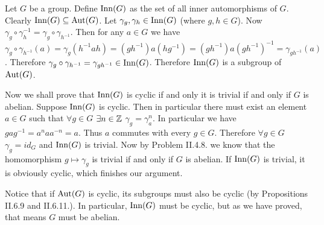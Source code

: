 \begin{problem}
\end{problem}

\begin{solution}
	Let $G$ be a group. Define $\mathrm{Inn}(G)$ as the set of all inner automorphisms of $G$. Clearly $\mathrm{Inn}(G) \subseteq \mathrm{Aut}(G)$. Let $\gamma_g, \gamma_h \in \mathrm{Inn}(G)$ (where $g, h \in G$). Now $\gamma_g \circ \gamma_h^{-1} = \gamma_g \circ \gamma_{h^{-1}}$. Then for any $a \in G$ we have $\gamma_g \circ \gamma_{h^{-1}} (a) = \gamma_g(h^{-1} a h) = (gh^{-1}) a (h g^{-1}) = (gh^{-1}) a (g h^{-1})^{-1} = \gamma_{gh^{-1}} (a)$. Therefore $\gamma_g \circ \gamma_{h^{-1}} = \gamma_{g h^{-1}} \in \mathrm{Inn}(G)$. Therefore $\mathrm{Inn}(G)$ is a subgroup of $\mathrm{Aut}(G)$.
	
	Now we shall prove that $\mathrm{Inn}(G)$ is cyclic if and only it is trivial if and only if $G$ is abelian. Suppose $\mathrm{Inn}(G)$ is cyclic. Then in particular there must exist an element $a \in G$ such that $\forall g \in G$ $\exists n \in \mathbb{Z}$ $\gamma_g = \gamma_a^n$. In particular we have $g a g^{-1} = a^n a a^{-n} = a$. Thus $a$ commutes with every $g \in G$. Therefore $\forall g \in G$ $\gamma_g = id_G$ and $\mathrm{Inn}(G)$ is trivial. Now by Problem II.4.8. we know that the homomorphism $g \mapsto \gamma_g$ is trivial if and only if $G$ is abelian. If $\mathrm{Inn}(G)$ is trivial, it is obviously cyclic, which finishes our argument.
	
	Notice that if $\mathrm{Aut}(G)$ is cyclic, its subgroups must also be cyclic (by Propositions II.6.9 and II.6.11.). In particular, $\mathrm{Inn}(G)$ must be cyclic, but as we have proved, that means $G$ must be abelian.
\end{solution}

\begin{problem}
\end{problem}

